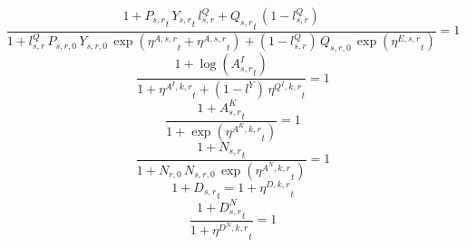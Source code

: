 \noindent[name= `sector TFP 3 1']
\begin{dmath}
\frac{1+{{P_{s,r}}}_{t}\, {{Y_{s,r}}}_{t}\, {{l^{Q}_{s,r}}}+{{Q_{s,r}}}_{t}\, \left(1-{{l^{Q}_{s,r}}}\right)}{1+{{l^{Q}_{s,r}}}\, {{P_{s,r,0}}}\, {{Y_{s,r,0}}}\, \exp\left({{\eta^{A,s,r}}}_{t}+{{\eta^{A,s,r}}}_{t}\right)+\left(1-{{l^{Q}_{s,r}}}\right)\, {{Q_{s,r,0}}}\, \exp\left({{\eta^{E,s,r}}}_{t}\right)}=1
\end{dmath}
\noindent[name= `intermediate input productivity 3 1']
\begin{dmath}
\frac{1+\log\left({{A^{I}_{s,r}}}_{t}\right)}{1+{{\eta^{A^{I},k,r}}}_{t}+\left(1-{{l^{Y}}}\right)\, {{\eta^{Q^{I},k,r}}}_{t}}=1
\end{dmath}
\noindent[name= `capital productivity shock 3 1']
\begin{dmath}
\frac{1+{{A^{K}_{s,r}}}_{t}}{1+\exp\left({{\eta^{A^{K},k,r}}}_{t}\right)}=1
\end{dmath}
\noindent[name= `exogenous labour input 3 1']
\begin{dmath}
\frac{1+{{N_{s,r}}}_{t}}{1+{{N_{r,0}}}\, {{N_{s,r,0}}}\, \exp\left({{\eta^{A^{N},k,r}}}_{t}\right)}=1
\end{dmath}
\noindent[name= `TFP damage 3 1']
\begin{dmath}
1+{{D_{s,r}}}_{t}=1+{{\eta^{D,k,r}}}_{t}
\end{dmath}
\noindent[name= `labour damage 3 1']
\begin{dmath}
\frac{1+{{D^N_{s,r}}}_{t}}{1+{{\eta^{D^{N},k,r}}}_{t}}=1
\end{dmath}
\noindent[name= `capital damage 3 1']
